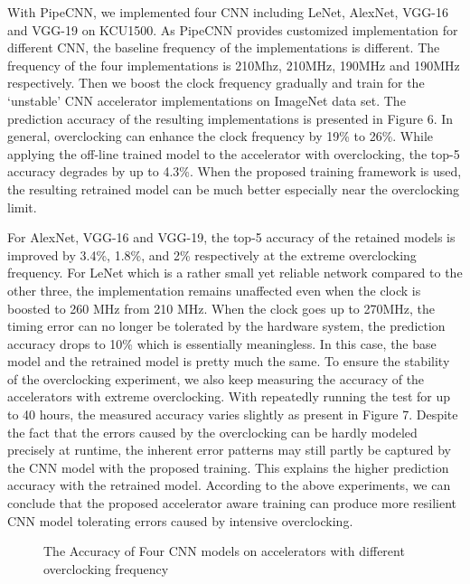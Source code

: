   With PipeCNN, we implemented four CNN including LeNet, AlexNet, VGG-16 and VGG-19 on KCU1500. 
As PipeCNN provides customized implementation for different CNN, the baseline frequency of the implementations 
is different. The frequency of the four implementations is 210Mhz, 210MHz, 190MHz and 190MHz respectively. 
Then we boost the clock frequency gradually and train for the ‘unstable’ CNN accelerator implementations on 
ImageNet data set.  The prediction accuracy of the resulting implementations is presented in Figure 6. In general, 
overclocking can enhance the clock frequency by 19\% to 26\%. While applying the off-line trained model 
to the accelerator with overclocking, the top-5 accuracy degrades by up to 4.3\%. When the proposed training 
framework is used, the resulting retrained model can be much better especially near the overclocking limit.

  For AlexNet, VGG-16 and VGG-19, the top-5 accuracy of the retained models is improved by 3.4\%, 1.8\%, and 2\% 
respectively at the extreme overclocking frequency. For LeNet which is a rather small yet reliable network 
compared to the other three, the implementation remains unaffected even when the clock is boosted to 260 MHz 
from 210 MHz. When the clock goes up to 270MHz, the timing error can no longer be tolerated by the hardware system, 
the prediction accuracy drops to 10\% which is essentially meaningless. In this case, the base model 
and the retrained model is pretty much the same. To ensure the stability of the overclocking experiment, 
we also keep measuring the accuracy of the accelerators with extreme overclocking. With repeatedly 
running the test for up to 40 hours, the measured accuracy varies slightly as present in Figure 7. 
Despite the fact that the errors caused by the overclocking can be hardly modeled precisely at runtime, 
the inherent error patterns may still partly be captured by the CNN model with the proposed training. 
This explains the higher prediction accuracy with the retrained model. According to the 
above experiments, we can conclude that the proposed accelerator aware training can produce 
more resilient CNN model tolerating errors caused by intensive overclocking. 

\begin{figure*}
        \center
	\qquad
	\qquad
        \qquad
	\caption{The Accuracy of Four CNN models on accelerators with different overclocking frequency}
        \label{fig:overclock accuracy}
\end{figure*}

